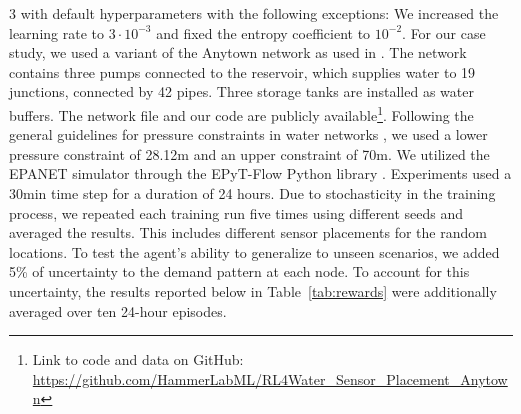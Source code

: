 3 \cite{raffin_stable_2021} with default hyperparameters with the following exceptions: 
We increased the learning rate to $3 \cdot 10^{-3}$ and fixed the entropy
coefficient to $10^{-2}$.
For our case study, we used a variant of the Anytown network
\cite{walski_battle_1987} as used in
\cite{reis_cost-efficient_2024}. The network contains three pumps connected to the reservoir, which supplies water to 19 junctions, connected by 42 pipes. Three
storage tanks are installed as water buffers. The network file and our code
are publicly available\footnote{Link to code and data on GitHub:
\href{https://github.com/HammerLabML/RL4Water\_Sensor\_Placement\_Anytown}{https://github.com/HammerLabML/RL4Water\_Sensor\_Placement\_Anytown}}.
Following the general guidelines for pressure constraints in water networks
\cite{ghorbanian_pressure_2016}, we used a lower pressure constraint of 28.12m and an upper constraint of 70m. We utilized the EPANET simulator
\cite{rossman_epanet_2020} through the EPyT-Flow Python library
\cite{artelt_epyt-flow_2024}. Experiments used a 30min
time step for a duration of 24 hours. Due to stochasticity in the training
process, we repeated each training run five times using different seeds and averaged the results. This includes different sensor placements for the random locations. To
test the agent's ability to generalize to unseen scenarios, we added 5\% of
uncertainty to the demand pattern at each node. To account for this
uncertainty, the results reported below in Table~\ref{tab:rewards} were
additionally averaged over ten 24-hour episodes.
